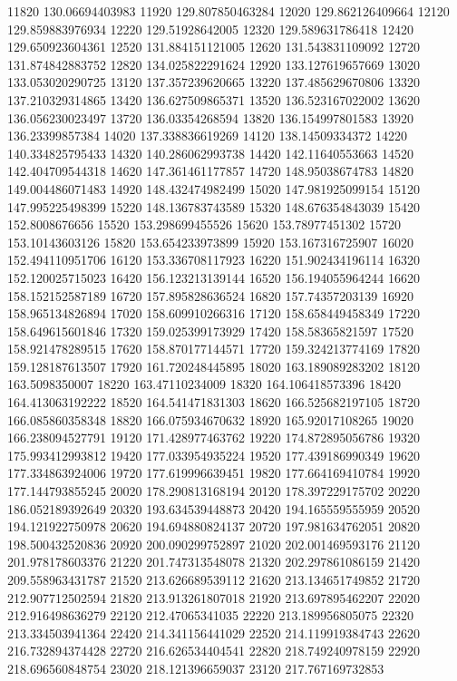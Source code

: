 {11820 130.06694403983
11920 129.807850463284
12020 129.862126409664
12120 129.859883976934
12220 129.51928642005
12320 129.589631786418
12420 129.650923604361
12520 131.884151121005
12620 131.543831109092
12720 131.874842883752
12820 134.025822291624
12920 133.127619657669
13020 133.053020290725
13120 137.357239620665
13220 137.485629670806
13320 137.210329314865
13420 136.627509865371
13520 136.523167022002
13620 136.056230023497
13720 136.03354268594
13820 136.154997801583
13920 136.23399857384
14020 137.338836619269
14120 138.14509334372
14220 140.334825795433
14320 140.286062993738
14420 142.11640553663
14520 142.404709544318
14620 147.361461177857
14720 148.95038674783
14820 149.004486071483
14920 148.432474982499
15020 147.981925099154
15120 147.995225498399
15220 148.136783743589
15320 148.676354843039
15420 152.8008676656
15520 153.298699455526
15620 153.78977451302
15720 153.10143603126
15820 153.654233973899
15920 153.167316725907
16020 152.494110951706
16120 153.336708117923
16220 151.902434196114
16320 152.120025715023
16420 156.123213139144
16520 156.194055964244
16620 158.152152587189
16720 157.895828636524
16820 157.74357203139
16920 158.965134826894
17020 158.609910266316
17120 158.658449458349
17220 158.649615601846
17320 159.025399173929
17420 158.58365821597
17520 158.921478289515
17620 158.870177144571
17720 159.324213774169
17820 159.128187613507
17920 161.720248445895
18020 163.189089283202
18120 163.5098350007
18220 163.47110234009
18320 164.106418573396
18420 164.413063192222
18520 164.541471831303
18620 166.525682197105
18720 166.085860358348
18820 166.075934670632
18920 165.92017108265
19020 166.238094527791
19120 171.428977463762
19220 174.872895056786
19320 175.993412993812
19420 177.033954935224
19520 177.439186990349
19620 177.334863924006
19720 177.619996639451
19820 177.664169410784
19920 177.144793855245
20020 178.290813168194
20120 178.397229175702
20220 186.052189392649
20320 193.634539448873
20420 194.165559555959
20520 194.121922750978
20620 194.694880824137
20720 197.981634762051
20820 198.500432520836
20920 200.090299752897
21020 202.001469593176
21120 201.978178603376
21220 201.747313548078
21320 202.297861086159
21420 209.558963431787
21520 213.626689539112
21620 213.134651749852
21720 212.907712502594
21820 213.913261807018
21920 213.697895462207
22020 212.916498636279
22120 212.47065341035
22220 213.189956805075
22320 213.334503941364
22420 214.341156441029
22520 214.119919384743
22620 216.732894374428
22720 216.626534404541
22820 218.749240978159
22920 218.696560848754
23020 218.121396659037
23120 217.767169732853
}
